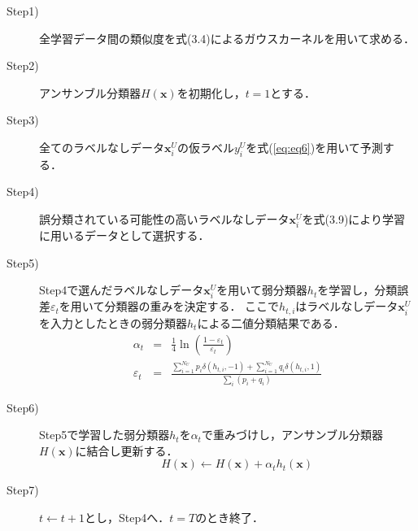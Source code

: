 \begin{description}
  \item[Step1)] 全学習データ間の類似度を式(3.4)によるガウスカーネルを用いて求める．

  \item[Step2)] アンサンブル分類器$H(\bm{x})$を初期化し，$t = 1$とする．

  \item[Step3)] 全てのラベルなしデータ$\bm{x}_i^U$の仮ラベル$y_i^U$を式(\ref{eq:eq6})を用いて予測する．

  \item[Step4)] 誤分類されている可能性の高いラベルなしデータ$\bm{x}_i^U$を式(3.9)により学習に用いるデータとして選択する．

  \item[Step5)] Step4で選んだラベルなしデータ$\bm{x}_i^U$を用いて弱分類器$h_t$を学習し，分類誤差$\varepsilon_t$を用いて分類器の重みを決定する．
ここで$h_{t,i}$はラベルなしデータ$\bm{x}_i^U$を入力としたときの弱分類器$h_t$による二値分類結果である．
\begin{eqnarray}
 \alpha_t &=& \frac{1}{4}\ln\left({\frac{1-\varepsilon_t}{\varepsilon_t}}\right)\\
\varepsilon_t &=& \frac{\sum_{i=1}^{N_U}p_i\delta(h_{t,i} ,-1)+\sum_{i=1}^{N_U}q_i\delta(h_{t,i} ,1)}{\sum_{i}(p_i+q_i)}
\end{eqnarray}

  \item[Step6)] Step5で学習した弱分類器$h_t$を$\alpha_t$で重みづけし，アンサンブル分類器$H(\bm{x})$に結合し更新する．
\begin{equation}
\label{eq:eq10}
 \hspace{20pt}H(\bm{x})\leftarrow H(\bm{x})+\alpha_t h_t(\bm{x})
\end{equation}\par

  \item[Step7)] $t \leftarrow t+1$とし，Step4へ．$t = T$のとき終了．

\end{description}\par
\vspace{2.0cm}


